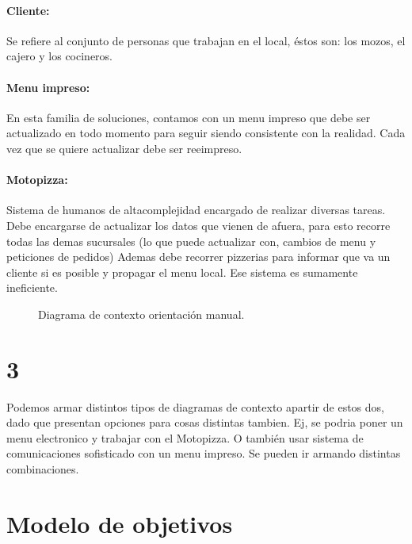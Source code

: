 \documentclass[a4paper,10pt]{article}
\begin{document}
\paragraph{Cliente:}
Se refiere al conjunto de personas que trabajan en el local, éstos son: los mozos, el cajero y los cocineros.
\\
\paragraph{Menu impreso:}
En esta familia de soluciones, contamos con un menu impreso que debe ser actualizado en todo momento para seguir siendo consistente con la realidad. Cada vez que se quiere actualizar debe ser reeimpreso.
\\
\paragraph{Motopizza:}
Sistema de humanos de altacomplejidad encargado de realizar diversas tareas. Debe encargarse de actualizar los datos que vienen de afuera, para esto recorre todas las demas sucursales (lo que puede actualizar con, cambios de menu y peticiones de pedidos) Ademas debe recorrer pizzerias para informar que va un cliente si es posible y propagar el menu local. Ese sistema es sumamente ineficiente.

\begin{figure}[H]
\centering
{}
\caption{Diagrama de contexto orientación manual.}
\end{figure}

\section*{3} Podemos armar distintos tipos de diagramas de contexto apartir de estos dos, dado que presentan opciones para cosas distintas tambien. Ej, se podria poner un menu electronico y trabajar con el Motopizza. O también usar sistema de comunicaciones sofisticado con un menu impreso. Se pueden ir armando distintas combinaciones.


\section*{Modelo de objetivos}

\end{document}
